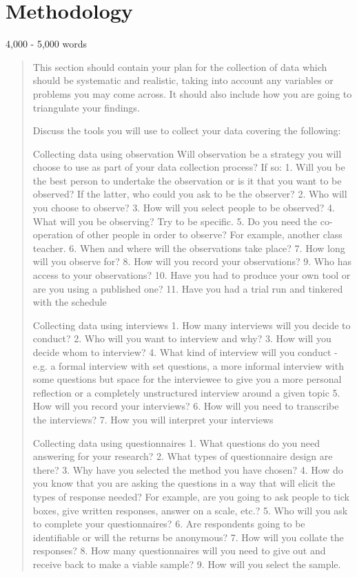 \section{Methodology}
4,000 - 5,000 words
\begin{quote}
This section should contain your plan for the collection of data which should be systematic and realistic, taking into account any variables or problems you may come across. It should also include how you are going to triangulate your findings.

Discuss the tools you will use to collect your data covering the following:

Collecting data using observation
Will observation be a strategy you will choose to use as part of your data collection process?
If so:
1.	Will you be the best person to undertake the observation or is it that you want to be observed?  If the latter, who could you ask to be the observer?
2.	Who will you choose to observe?
3.	How will you select people to be observed?
4.	What will you be observing?  Try to be specific.
5.	Do you need the co-operation of other people in order to observe?  For example, another class teacher.
6.	When and where will the observations take place?
7.	How long will you observe for?
8.	How will you record your observations?
9.	Who has access to your observations?
10.	Have you had to produce your own tool or are you using a published one?
11.	Have you had a trial run and tinkered with the schedule

Collecting data using interviews
1.	How many interviews will you decide to conduct?
2.	Who will you want to interview and why?
3.	How will you decide whom to interview?
4.	What kind of interview will you conduct - e.g. a formal interview with set questions, a more informal interview with some questions but space for the interviewee to give you a more personal reflection or a completely unstructured interview around a given topic
5.	How will you record your interviews?
6.	How will you need to transcribe the interviews?
7.	How you will interpret your interviews
	
Collecting data using questionnaires
1.	What questions do you need answering for your research?
2.	What types of questionnaire design are there?
3.	Why have you selected the method you have chosen?
4.	How do you know that you are asking the questions in a way that will elicit the types of response needed?  For example, are you going to ask people to tick boxes, give written responses, answer on a scale, etc.?
5.	Who will you ask to complete your questionnaires?
6.	Are respondents going to be identifiable or will the returns be anonymous?
7.	How will you collate the responses?
8.	How many questionnaires will you need to give out and receive back to make a viable sample?
9.	How will you select the sample.



\end{quote}
